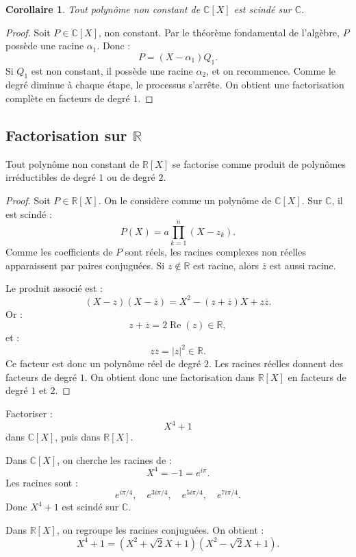 \documentclass[11pt,a4paper]{article}
\newcommand{\R}{\mathbb R}
\newcommand{\C}{\mathbb C}
\newtheorem{corollaire}[prop]{Corollaire}
\begin{document}
\begin{corollaire}
Tout polynôme non constant de \(\C[X]\) est scindé sur \(\C\).
\end{corollaire}

\begin{proof}
Soit \(P\in\C[X]\), non constant.  
Par le théorème fondamental de l'algèbre, \(P\) possède une racine \(\alpha_1\).  
Donc :
\[
P=(X-\alpha_1)Q_1.
\]
Si \(Q_1\) est non constant, il possède une racine \(\alpha_2\), et on recommence.  
Comme le degré diminue à chaque étape, le processus s'arrête.  
On obtient une factorisation complète en facteurs de degré \(1\).
\end{proof}

\subsection{Factorisation sur \(\R\)}

\begin{theorembox}
Tout polynôme non constant de \(\R[X]\) se factorise comme produit de polynômes irréductibles de degré \(1\) ou de degré \(2\).
\end{theorembox}

\begin{proof}
Soit \(P\in\R[X]\).  
On le considère comme un polynôme de \(\C[X]\).  
Sur \(\C\), il est scindé :
\[
P(X)=a\prod_{k=1}^n(X-z_k).
\]
Comme les coefficients de \(P\) sont réels, les racines complexes non réelles apparaissent par paires conjuguées.  
Si \(z\notin\R\) est racine, alors \(\overline z\) est aussi racine.

Le produit associé est :
\[
(X-z)(X-\overline z)
=
X^2-(z+\overline z)X+z\overline z.
\]
Or :
\[
z+\overline z=2\operatorname{Re}(z)\in\R,
\]
et :
\[
z\overline z=|z|^2\in\R.
\]
Ce facteur est donc un polynôme réel de degré \(2\).  
Les racines réelles donnent des facteurs de degré \(1\).  
On obtient donc une factorisation dans \(\R[X]\) en facteurs de degré \(1\) et \(2\).
\end{proof}

\begin{exercicebox}[Factorisation de \(X^4+1\)]
Factoriser :
\[
X^4+1
\]
dans \(\C[X]\), puis dans \(\R[X]\).
\end{exercicebox}

\begin{correctionbox}
Dans \(\C[X]\), on cherche les racines de :
\[
X^4=-1=e^{i\pi}.
\]
Les racines sont :
\[
e^{i\pi/4},
\quad
e^{3i\pi/4},
\quad
e^{5i\pi/4},
\quad
e^{7i\pi/4}.
\]
Donc \(X^4+1\) est scindé sur \(\C\).

Dans \(\R[X]\), on regroupe les racines conjuguées.  
On obtient :
\[
X^4+1=(X^2+\sqrt2X+1)(X^2-\sqrt2X+1).
\]
\end{correctionbox}
\end{document}
